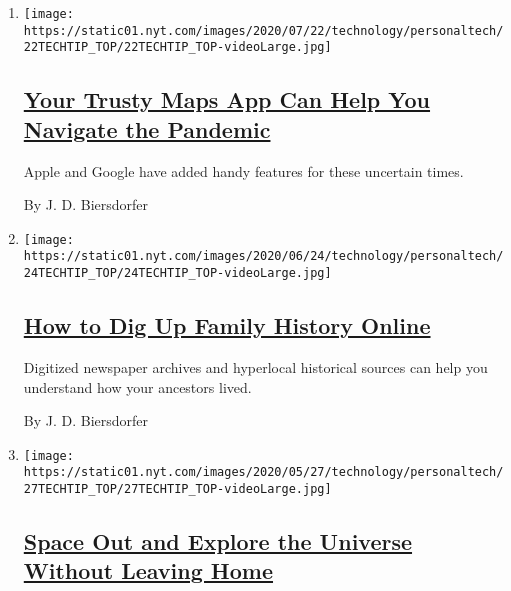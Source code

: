 \begin{enumerate}
\def\labelenumi{\arabic{enumi}.}
\item
  \texttt{[image: https://static01.nyt.com/images/2020/07/22/technology/personaltech/22TECHTIP\_TOP/22TECHTIP\_TOP-videoLarge.jpg]}

  \hypertarget{your-trusty-maps-app-can-help-you-navigate-the-pandemic}{%
  \subsection{\texorpdfstring{\href{/2020/07/22/technology/personaltech/maps-apps-coronavirus-pandemic.html}{Your
  Trusty Maps App Can Help You Navigate the
  Pandemic}}{Your Trusty Maps App Can Help You Navigate the Pandemic}}\label{your-trusty-maps-app-can-help-you-navigate-the-pandemic}}

  Apple and Google have added handy features for these uncertain times.

  By J. D. Biersdorfer
\item
  \texttt{[image: https://static01.nyt.com/images/2020/06/24/technology/personaltech/24TECHTIP\_TOP/24TECHTIP\_TOP-videoLarge.jpg]}

  \hypertarget{how-to-dig-up-family-history-online}{%
  \subsection{\texorpdfstring{\href{/2020/06/24/technology/personaltech/family-history-genealogy-online.html}{How
  to Dig Up Family History
  Online}}{How to Dig Up Family History Online}}\label{how-to-dig-up-family-history-online}}

  Digitized newspaper archives and hyperlocal historical sources can
  help you understand how your ancestors lived.

  By J. D. Biersdorfer
\item
  \texttt{[image: https://static01.nyt.com/images/2020/05/27/technology/personaltech/27TECHTIP\_TOP/27TECHTIP\_TOP-videoLarge.jpg]}

  \hypertarget{space-out-and-explore-the-universe-without-leaving-home}{%
  \subsection{\texorpdfstring{\href{/2020/05/27/technology/personaltech/techtip-nasa-apps.html}{Space
  Out and Explore the Universe Without Leaving
  Home}}{Space Out and Explore the Universe Without Leaving Home}}\label{space-out-and-explore-the-universe-without-leaving-home}}


\end{enumerate}
